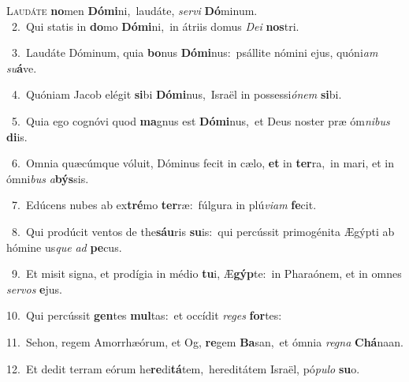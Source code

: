 \lettrine{\initial\textcolor{\initialcolor}{L}}{audáte} \textbf{no}\-men \textbf{Dó}\-\textbf{mi}ni,~\star laudáte, \textit{ser}\-\textit{vi} \textbf{Dó}\-minum.\\
{\numbfont\textcolor{\numbcolor}{~2.}}~Qui statis in \textbf{do}\-mo \textbf{Dó}\-\textbf{mi}ni,~\star in átriis domus \textit{De}\-\textit{i} \textbf{nos}\-tri.\par
{\numbfont\textcolor{\numbcolor}{~3.}}~Laudáte Dóminum, quia \textbf{bo}\-nus \textbf{Dó}\-\textbf{mi}nus:~\star psállite nómini ejus, quóni\textit{am} \textit{su}\-\textbf{á}ve.\par
{\numbfont\textcolor{\numbcolor}{~4.}}~Quóniam Jacob elégit \textbf{si}\-bi \textbf{Dó}\-\textbf{mi}nus,~\star Israël in possessi\-\textit{ó}\-\textit{nem} \textbf{si}\-bi.\par
{\numbfont\textcolor{\numbcolor}{~5.}}~Quia ego cognóvi quod \textbf{ma}\-gnus est \textbf{Dó}\-\textbf{mi}nus,~\star et Deus noster præ óm\-\textit{ni}\-\textit{bus} \textbf{di}\-is.\par
{\numbfont\textcolor{\numbcolor}{~6.}}~Omnia quæcúmque vóluit, Dóminus fecit in cælo, \textbf{et} in \textbf{ter}\-ra,~\star in mari, et in ómni\textit{bus} \textit{a}\-\textbf{býs}sis.\par
{\numbfont\textcolor{\numbcolor}{~7.}}~Edúcens nubes ab ex\-\textbf{tré}\-mo \textbf{ter}\-ræ:~\star fúlgura in plú\-\textit{vi}\-\textit{am} \textbf{fe}\-cit.\par
{\numbfont\textcolor{\numbcolor}{~8.}}~Qui prodúcit ventos de the\-\textbf{sáu}\-ris \textbf{su}\-is:~\star qui percússit primogénita Ægýpti ab hómine us\textit{que} \textit{ad} \textbf{pe}\-cus.\par
{\numbfont\textcolor{\numbcolor}{~9.}}~Et misit signa, et prodígia in médio \textbf{tu}\-i, Æ\-\textbf{gýp}\-te:~\star in Pharaónem, et in omnes \textit{ser}\-\textit{vos} \textbf{e}\-jus.\par
{\numbfont\textcolor{\numbcolor}{10.}}~Qui percússit \textbf{gen}\-tes \textbf{mul}\-tas:~\star et occídit \textit{re}\-\textit{ges} \textbf{for}\-tes:\par
{\numbfont\textcolor{\numbcolor}{11.}}~Sehon, regem Amorrhæórum, et Og, \textbf{re}\-gem \textbf{Ba}\-san,~\star et ómnia \textit{re}\-\textit{gna} \textbf{Chá}\-naan.\par
{\numbfont\textcolor{\numbcolor}{12.}}~Et dedit terram eórum he\-\textbf{re}\-di\-\textbf{tá}\-tem,~\star hereditátem Israël, pó\-\textit{pu}\-\textit{lo} \textbf{su}\-o.\par
